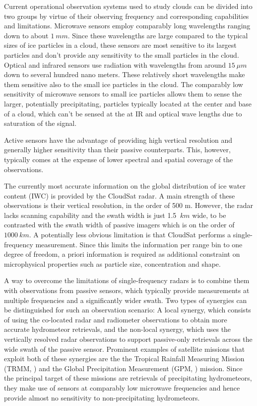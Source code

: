 \documentclass[journal abbreviation, manuscript]{copernicus}
\begin{document}
Current operational observation systems used to study clouds can be divided into
two groups by virtue of their observing frequency and corresponding capabilities
and limitations. Microwave sensors employ comparably long wavelengths ranging
down to about $1\ \unit{mm}$. Since these wavelengths are large compared to the
typical sizes of ice particles in a cloud, these sensors are most sensitive to
its largest particles and don't provide any sensitivity to the small particles
in the cloud. Optical and infrared sensors use radiation with wavelengths from
around $15\ \unit{\mu m}$ down to several hundred nano meters. These relatively
short wavelengths make them sensitive also to the small ice particles in the
cloud. The comparably low sensitivity of microwave sensors to small ice
particles allows them to sense the larger, potentially precipitating, particles
typically located at the center and base of a cloud, which can't be sensed at
the at IR and optical wave lengths due to saturation of the signal.

Active sensors have the advantage of providing high vertical resolution and
generally higher sensitivity than their passive counterparts. This, however,
typically comes at the expense of lower spectral and spatial coverage of
the observations.

The currently most accurate information on the global distribution of ice water
content (IWC) is provided by the CloudSat radar. A main strength of these
observations is their vertical resolution, in the order of 500 m. However, the
radar lacks scanning capability and the swath width is just 1.5 $\ \unit{km}$
wide, to be contrasted with the swath width of passive imagers which is on the
order of $1000\ \unit{km}$. A potentially less obvious limitation is that
CloudSat performs a single-frequency measurement. Since this limits the
information per range bin to one degree of freedom, a priori information is
required as additional constraint on microphysical properties such as particle
size, concentration and shape.

A way to overcome the limitations of single-frequency radars is to combine them
with observations from passive sensors, which typically provide measurements at
multiple frequencies and a significantly wider swath. Two types of synergies can
be distinguished for such an observation scenario: A local synergy, which
consists of using the co-located radar and radiometer observations to obtain
more accurate hydrometeor retrievals, and the non-local synergy, which uses the
vertically resolved radar observations to support passive-only retrievals across
the wide swath of the passive sensor. Prominent examples of satellite missions
that exploit both of these synergies are the the Tropical Rainfall Measuring
Mission (TRMM, \citet{kummerow98, grecu04, munchak11}) and the Global
Precipitation Measurement (GPM, \cite{hou14, grecu16, kummerow15}) mission.
Since the principal target of these missions are retrievals of precipitating
hydrometeors, they make use of sensors at comparably low microwave frequencies
and hence provide almost no sensitivity to non-precipitating hydrometeors.
\end{document}
